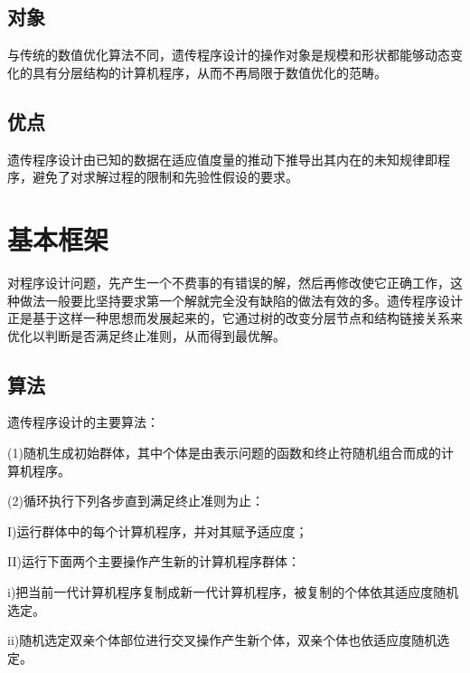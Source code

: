 \documentclass[UTF8]{ctexart}
\begin{document}
\subsection{对象}
与传统的数值优化算法不同，遗传程序设计的操作对象是规模和形状都能够动态变化的具有分层结构的计算机程序，从而不再局限于数值优化的范畴。

\subsection{优点}
遗传程序设计由已知的数据在适应值度量的推动下推导出其内在的未知规律即程序，避免了对求解过程的限制和先验性假设的要求。

\section{基本框架}
对程序设计问题，先产生一个不费事的有错误的解，然后再修改使它正确工作，这种做法一般要比坚持要求第一个解就完全没有缺陷的做法有效的多。遗传程序设计正是基于这样一种思想而发展起来的，它通过树的改变分层节点和结构链接关系来优化以判断是否满足终止准则，从而得到最优解。

\subsection{算法}
 	遗传程序设计的主要算法：	
 	
 	(1)随机生成初始群体，其中个体是由表示问题的函数和终止符随机组合而成的计算机程序。
 	
 	(2)循环执行下列各步直到满足终止准则为止：
 	
 	I)运行群体中的每个计算机程序，并对其赋予适应度；
 	
 	II)运行下面两个主要操作产生新的计算机程序群体：
 	
 	\qquad i)把当前一代计算机程序复制成新一代计算机程序，被复制的个体依其适应度随机选定。
 	
 	\qquad ii)随机选定双亲个体部位进行交叉操作产生新个体，双亲个体也依适应度随机选定。
 	
\end{document}

